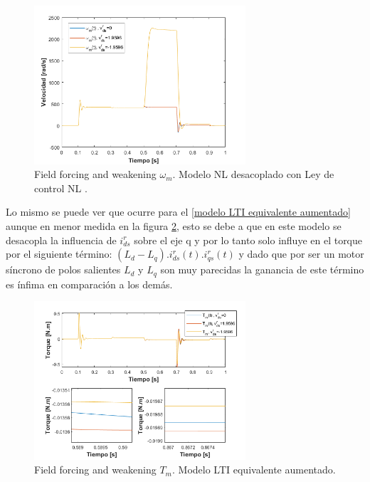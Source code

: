 \documentclass[10pt]{article}
\begin{document}
\begin{itemize}
	\begin{figure}[h!]
	\centering
	\includegraphics[width=0.7\textwidth]{wdistintode0.png}
	\caption{\label{fig:wdistintode0} Field forcing and weakening $\omega_{m}$. Modelo NL desacoplado con Ley de control NL .}
	\end{figure}
	
	Lo mismo se puede ver que ocurre para el \ref{modelo LTI equivalente aumentado} aunque en menor medida en la figura \ref{fig:Tdistintode0LTI}, esto se debe a que en este modelo se desacopla la influencia de $i^{r}_{ds}$ sobre el eje q y por lo tanto solo influye en el torque por el siguiente término: $(L_{d}-L_{q}).i^{r}_{ds}(t).i^{r}_{qs}(t)$ y dado que por ser un motor síncrono de polos salientes $L_{d}$ y $L_{q}$ son muy parecidas la ganancia de este término es ínfima en comparación a los demás.
	
	\begin{figure}[h!]
	\centering
	\includegraphics[width=0.7\textwidth]{Tdistintode0LTI.png}
	\caption{\label{fig:Tdistintode0LTI} Field forcing and weakening $T_{m}$. Modelo LTI equivalente aumentado.}
	\end{figure}
	
\end{itemize}
\end{document}
